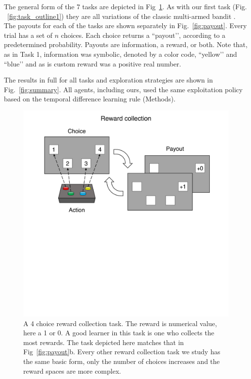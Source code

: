 The general form of the 7 tasks are depicted in Fig~\ref{fig:task_outline2}. As with our first task (Fig. ~\ref{fig:task_outline1}) they are all variations of the classic multi-armed bandit \citep{Sutton2018}. The payouts for each of the tasks are shown separately in Fig.~\ref{fig:payout}. Every trial has a set of $n$ choices. Each choice returns a ``payout’’, according to a predetermined probability. Payouts are information, a reward, or both. Note that, as in Task 1, information was symbolic, denoted by a color code, ``yellow’’ and ``blue’’ and as is custom reward was a positive real number. 

The results in full for all tasks and exploration strategies are shown in Fig.~\ref{fig:summary}. All agents, including ours, used the same exploitation policy based on the temporal difference learning rule \citep{Sutton2018} (Methods).

\begin{figure}
	\begin{fullwidth}
	\includegraphics[width=0.7\linewidth]{img/task_outline2.pdf} 
	\caption{A 4 choice reward collection task. The reward is numerical value, here a 1 or 0. A good learner in this task is one who collects the most rewards. The task depicted here matches that in Fig~\ref{fig:payout}b. Every other reward collection task we study has the same basic form, only the number of choices increases and the reward spaces are more complex.}
	\label{fig:task_outline2} 
	\end{fullwidth}
\end{figure}

